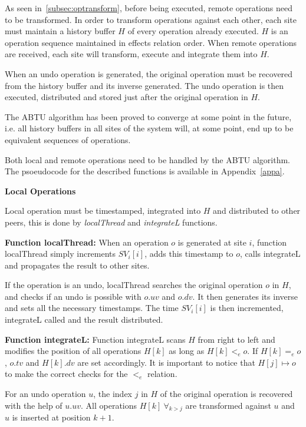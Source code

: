 \documentclass[11pt, a4paper, oneside, openright]{article} %
\begin{document}
As seen in~\ref{subsec:optransform}, before being executed, remote operations need to be transformed. In order to transform operations against each other, each site must maintain a history buffer $H$ of every operation already executed. $H$ is an operation sequence maintained in effects relation order. When remote operations are received, each site will transform, execute and integrate them into $H$.

When an undo operation is generated, the original operation must be recovered from the history buffer and its inverse generated. The undo operation is then executed, distributed and stored just after the original operation in $H$.

The ABTU algorithm has been proved to converge at some point in the future, i.e. all history buffers in all sites of the system will, at some point, end up to be equivalent sequences of operations.

Both local and remote operations need to be handled by the ABTU algorithm. The psoeudocode for the described functions is available in Appendix~\ref{appa}.

\textbf{Local Operations}

 Local operation must be timestamped, integrated into $H$ and distributed to other peers, this is done by \textit{localThread} and \textit{integrateL} functions.

\textbf{Function localThread:} When an operation $o$ is generated at site $i$, function localThread simply increments $SV_i[i]$, adds this timestamp to $o$, calls integrateL and propagates the result to other sites.

If the operation is an undo, localThread searches the original operation $o$ in $H$, and checks if an undo is possible with $o.uv$ and $o.dv$. It then generates its inverse and sets all the necessary timestamps. The time $SV_i[i]$ is then incremented, integrateL called and the result distributed.

\textbf{Function integrateL:} Function integrateL scans $H$ from right to left and modifies the position of all operations $H[k]$ as long as $H[k] <_e o$. If $H[k] =_e o$, $o.tv$ and $H[k].dv$ are set accordingly. It is important to notice that $H[j] \mapsto o$ to make the correct checks for the $<_e$ relation. 

For an undo operation $u$, the index $j$ in $H$ of the original operation is recovered with the help of $u.uv$. All operations $H[k] \ \forall_{k>j}$ are transformed against $u$ and $u$ is inserted at position $k+1$.
\end{document}
